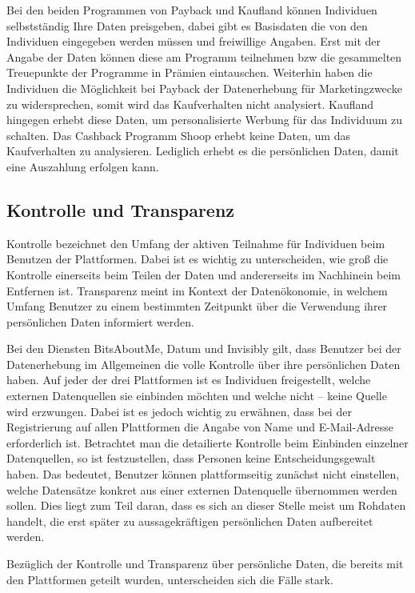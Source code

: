 \noindent Bei den beiden Programmen von Payback und Kaufland können Individuen selbstständig Ihre Daten preisgeben, dabei gibt es Basisdaten die von den Individuen eingegeben werden müssen und freiwillige Angaben. Erst mit der Angabe der Daten können diese am Programm teilnehmen bzw die gesammelten Treuepunkte der Programme in Prämien eintauschen. Weiterhin haben die Individuen die Möglichkeit bei Payback der Datenerhebung für Marketingzwecke zu widersprechen, somit wird das Kaufverhalten nicht analysiert. Kaufland hingegen erhebt diese Daten, um personalisierte Werbung für das Individuum zu schalten. Das Cashback Programm Shoop erhebt keine Daten, um das Kaufverhalten zu analysieren. Lediglich erhebt es die persönlichen Daten, damit eine Auszahlung erfolgen kann.

\subsection{Kontrolle und Transparenz}
Kontrolle bezeichnet den Umfang der aktiven Teilnahme für Individuen beim Benutzen der Plattformen. Dabei ist es wichtig zu unterscheiden, wie groß die Kontrolle einerseits beim Teilen der Daten und andererseits im Nachhinein beim Entfernen ist. Transparenz meint im Kontext der Datenökonomie, in welchem Umfang Benutzer zu einem bestimmten Zeitpunkt über die Verwendung ihrer persönlichen Daten informiert werden. \newline

\noindent Bei den Diensten BitsAboutMe, Datum und Invisibly gilt, dass Benutzer bei der Datenerhebung im Allgemeinen die volle Kontrolle über ihre persönlichen Daten haben. Auf jeder der drei Plattformen ist es Individuen freigestellt, welche externen Datenquellen sie einbinden möchten und welche nicht -- keine Quelle wird erzwungen. Dabei ist es jedoch wichtig zu erwähnen, dass bei der Registrierung auf allen Plattformen die Angabe von Name und E-Mail-Adresse erforderlich ist. Betrachtet man die detailierte Kontrolle beim Einbinden einzelner Datenquellen, so ist festzustellen, dass Personen keine Entscheidungsgewalt haben. Das bedeutet, Benutzer können plattformseitig zunächst nicht einstellen, welche Datensätze konkret aus einer externen Datenquelle übernommen werden sollen. Dies liegt zum Teil daran, dass es sich an dieser Stelle meist um Rohdaten handelt, die erst später zu aussagekräftigen persönlichen Daten aufbereitet werden. \newline

\noindent Bezüglich der Kontrolle und Transparenz über persönliche Daten, die bereits mit den Plattformen geteilt wurden, unterscheiden sich die Fälle stark. \newline

